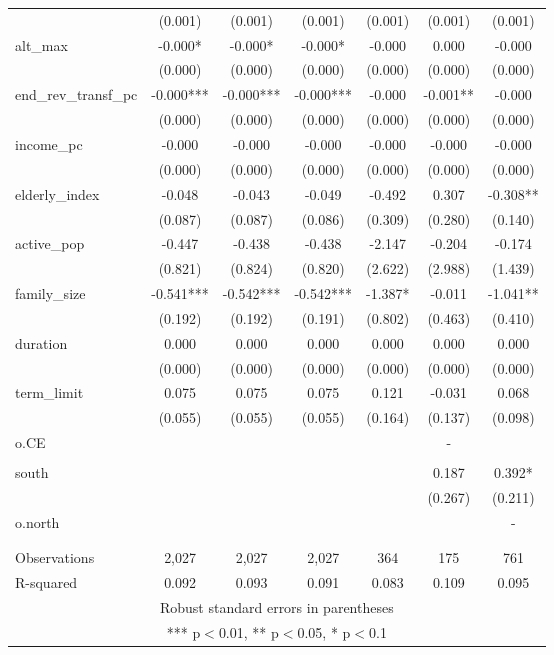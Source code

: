 \documentclass[]{article}
\begin{document}
\begin{tabular}{lcccccc}
 & (0.001) & (0.001) & (0.001) & (0.001) & (0.001) & (0.001) \\
alt\_max & -0.000* & -0.000* & -0.000* & -0.000 & 0.000 & -0.000 \\
 & (0.000) & (0.000) & (0.000) & (0.000) & (0.000) & (0.000) \\
end\_rev\_transf\_pc & -0.000*** & -0.000*** & -0.000*** & -0.000 & -0.001** & -0.000 \\
 & (0.000) & (0.000) & (0.000) & (0.000) & (0.000) & (0.000) \\
income\_pc & -0.000 & -0.000 & -0.000 & -0.000 & -0.000 & -0.000 \\
 & (0.000) & (0.000) & (0.000) & (0.000) & (0.000) & (0.000) \\
elderly\_index & -0.048 & -0.043 & -0.049 & -0.492 & 0.307 & -0.308** \\
 & (0.087) & (0.087) & (0.086) & (0.309) & (0.280) & (0.140) \\
active\_pop & -0.447 & -0.438 & -0.438 & -2.147 & -0.204 & -0.174 \\
 & (0.821) & (0.824) & (0.820) & (2.622) & (2.988) & (1.439) \\
family\_size & -0.541*** & -0.542*** & -0.542*** & -1.387* & -0.011 & -1.041** \\
 & (0.192) & (0.192) & (0.191) & (0.802) & (0.463) & (0.410) \\
duration & 0.000 & 0.000 & 0.000 & 0.000 & 0.000 & 0.000 \\
 & (0.000) & (0.000) & (0.000) & (0.000) & (0.000) & (0.000) \\
term\_limit & 0.075 & 0.075 & 0.075 & 0.121 & -0.031 & 0.068 \\
 & (0.055) & (0.055) & (0.055) & (0.164) & (0.137) & (0.098) \\
o.CE &  &  &  &  & - &  \\
 &  &  &  &  &  &  \\
south &  &  &  &  & 0.187 & 0.392* \\
 &  &  &  &  & (0.267) & (0.211) \\
o.north &  &  &  &  &  & - \\
 &  &  &  &  &  &  \\
 &  &  &  &  &  &  \\
Observations & 2,027 & 2,027 & 2,027 & 364 & 175 & 761 \\
 R-squared & 0.092 & 0.093 & 0.091 & 0.083 & 0.109 & 0.095 \\ \hline
\multicolumn{7}{c}{ Robust standard errors in parentheses} \\
\multicolumn{7}{c}{ *** p$<$0.01, ** p$<$0.05, * p$<$0.1} \\
\end{tabular}
\end{document}
